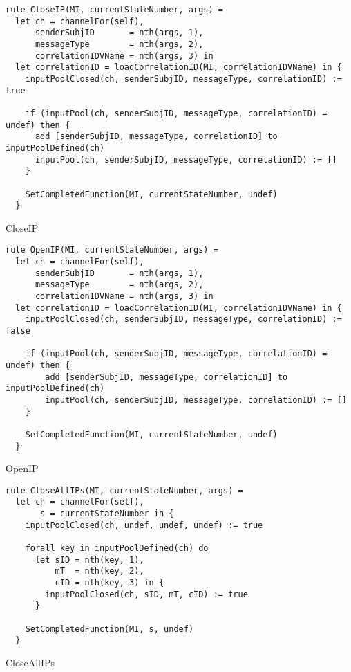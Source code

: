 \begin{listing}[H]
\begin{verbatim}
rule CloseIP(MI, currentStateNumber, args) =
  let ch = channelFor(self),
      senderSubjID       = nth(args, 1),
      messageType        = nth(args, 2),
      correlationIDVName = nth(args, 3) in
  let correlationID = loadCorrelationID(MI, correlationIDVName) in {
    inputPoolClosed(ch, senderSubjID, messageType, correlationID) := true

    if (inputPool(ch, senderSubjID, messageType, correlationID) = undef) then {
      add [senderSubjID, messageType, correlationID] to inputPoolDefined(ch)
      inputPool(ch, senderSubjID, messageType, correlationID) := []
    }

    SetCompletedFunction(MI, currentStateNumber, undef)
  }
\end{verbatim}
\caption{CloseIP}
\label{lst:asm:CloseIP}
\end{listing}




\begin{listing}[H]
\begin{verbatim}
rule OpenIP(MI, currentStateNumber, args) =
  let ch = channelFor(self),
      senderSubjID       = nth(args, 1),
      messageType        = nth(args, 2),
      correlationIDVName = nth(args, 3) in
  let correlationID = loadCorrelationID(MI, correlationIDVName) in {
    inputPoolClosed(ch, senderSubjID, messageType, correlationID) := false

    if (inputPool(ch, senderSubjID, messageType, correlationID) = undef) then {
        add [senderSubjID, messageType, correlationID] to inputPoolDefined(ch)
        inputPool(ch, senderSubjID, messageType, correlationID) := []
    }

    SetCompletedFunction(MI, currentStateNumber, undef)
  }
\end{verbatim}
\caption{OpenIP}
\label{lst:asm:OpenIP}
\end{listing}




\begin{listing}[H]
\begin{verbatim}
rule CloseAllIPs(MI, currentStateNumber, args) =
  let ch = channelFor(self),
       s = currentStateNumber in {
    inputPoolClosed(ch, undef, undef, undef) := true

    forall key in inputPoolDefined(ch) do
      let sID = nth(key, 1),
          mT  = nth(key, 2),
          cID = nth(key, 3) in {
        inputPoolClosed(ch, sID, mT, cID) := true
      }

    SetCompletedFunction(MI, s, undef)
  }
\end{verbatim}
\caption{CloseAllIPs}
\label{lst:asm:CloseAllIPs}
\end{listing}




